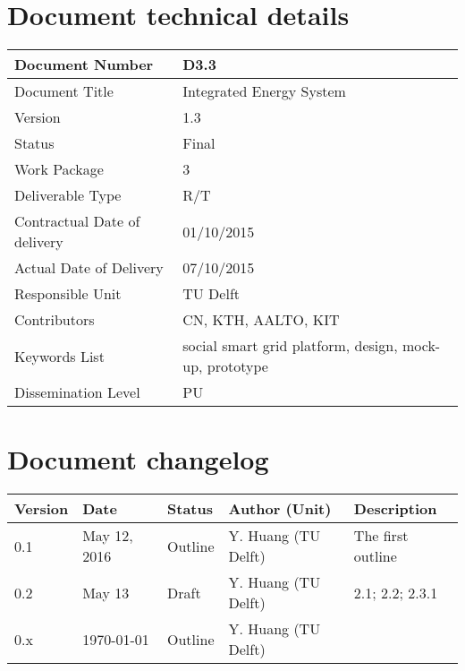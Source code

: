 
\section*{Document technical details}

\begin{tabularx}{\textwidth}{|X|X|}
\hline
Document Number	& D3.3 \\ \hline
Document Title	&  Integrated Energy System\\ \hline
Version	&  1.3\\ \hline
Status	 &  Final \\ \hline
Work Package		&  3\\ \hline
Deliverable Type 	&  R/T \\ \hline
Contractual Date of delivery 	&  01/10/2015 \\ \hline
Actual Date of Delivery		&  07/10/2015 \\ \hline
Responsible Unit	&  TU Delft \\ \hline
Contributors & CN, KTH, AALTO, KIT \\ \hline
Keywords List &  social smart grid platform, design, mock-up, prototype\\ \hline
Dissemination Level	&  PU \\ \hline
\end{tabularx}

\clearpage

\section*{Document changelog}

{
\begin{tabularx}{\textwidth}{|l|l|l|>{\raggedright\arraybackslash}p{4cm}|X|}
\hline
\textbf{Version}	& \textbf{Date} &	\textbf{Status} &	\textbf{Author (Unit)} &	\textbf{Description}  \\ \hline
0.1 & May 12, 2016 & Outline & Y. Huang (TU Delft) & The first outline\\ \hline
0.2 & May 13 & Draft & Y. Huang (TU Delft) &  2.1; 2.2; 2.3.1\\ \hline
0.x & \today & Outline & Y. Huang (TU Delft) &  \\ \hline

\end{tabularx}
}


